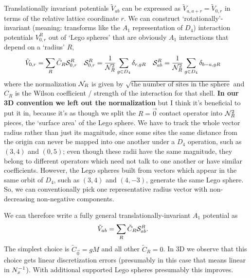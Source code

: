 Translationally invariant potentials $\tilde{V}_{ab}$ can be expressed as $\tilde{V}_{a,a+r} = \tilde{V}_{0,r}$  in terms of the relative lattice coordinate $r$.
We can construct `rotationally'-invariant (meaning: transforms like the $A_1$ representation of $D_4$) interaction potentials $V^R_{0,r}$ out of `Lego spheres'  that are obviously $A_1$ interactions that depend on a `radius' $R$,
\begin{align}
	\tilde{V}_{0,r} &= \sum_{R} \tilde{C}_R \mathcal{S}^{R}_{0,r}
    &
    \mathcal{S}^{R}_{0,r} &= \frac{1}{\mathcal{N}_{R}^2}\sum_{g \in D_4} \delta_{r, gR}
    &
    \mathcal{S}^{R}_{ab} &= \frac{1}{\mathcal{N}_{R}^2}\sum_{g \in D_4} \delta_{b-a,gR}
    \label{eq:Lego sphere}
\end{align}
where the normalization $\mathcal{N}_{R}$ is given by $\sqrt{\textrm{the number of sites in the sphere}}$ and $C_R$ is the Wilson coefficient / strength of the interaction for that shell.
{\bf In our 3D convention we left out the normalization} but I think it's beneficial to put it in, because it's as though we split the $R=\vec{0}$ contact operator into $\mathcal{N}_{R}^2$ pieces, the `surface area' of the Lego sphere.
We have to track the whole vector radius rather than just its magnitude, since some sites the same distance from the origin can never be mapped into one another under a $D_4$ operation, such as $(3,4)$ and $(0,5)$; even though these radii have the same magnitude, they belong to different operators which need not talk to one another or have similar coefficients.
However, the Lego spheres built from vectors which appear in the same orbit of $D_4$, such as $(3,4)$ and $(4,-3)$, generate the same Lego sphere.
So, we can conventionally pick one representative radius vector with non-decreasing non-negative components.

We can therefore write a fully general translationally-invariant $A_1$ potential as
\begin{align}
	\tilde{V}_{ab} &= \sum_{R} \tilde{C}_R \mathcal{S}^{R}_{ab}.
\end{align}
The simplest choice is $\tilde{C}_{\vec{0}} = gM$ and all other $\tilde{C}_R=0$.
In 3D we observe that this choice gets linear discretization errors (presumably in this case that means linear in $N_x^{-1}$).
With additional supported Lego spheres presumably this improves.
